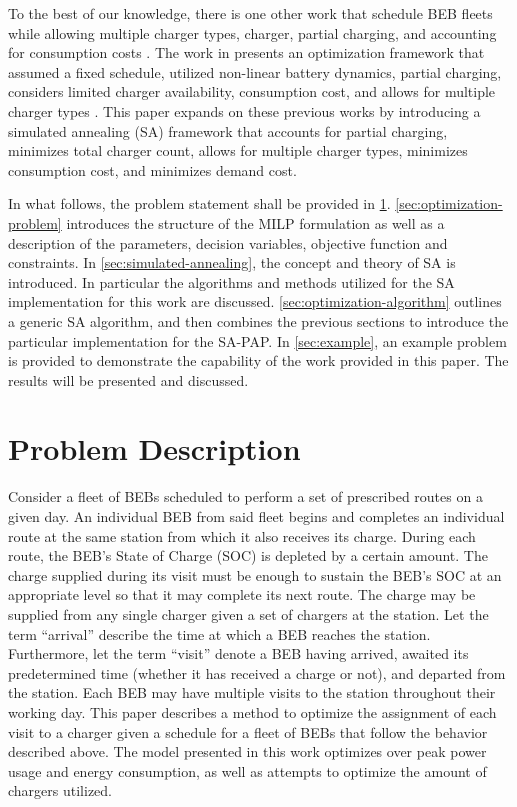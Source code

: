 \documentclass[ee,thesis]{usuthesis}
\begin{document}
To the best of our knowledge, there is one other work that schedule BEB fleets while allowing multiple charger types,
charger, partial charging, and accounting for consumption costs \cite{whitaker-2023-a-network}. The work in
\cite{whitaker-2023-a-network} presents an optimization framework that assumed a fixed schedule, utilized non-linear
battery dynamics, partial charging, considers limited charger availability, consumption cost, and allows for multiple
charger types \cite{whitaker-2023-a-network}. This paper expands on these previous works by introducing a simulated
annealing (SA) framework that accounts for partial charging, minimizes total charger count, allows for multiple charger
types, minimizes consumption cost, and minimizes demand cost.

In what follows, the problem statement shall be provided in \ref{sec:problem-description}. \ref{sec:optimization-problem}
introduces the structure of the MILP formulation as well as a description of the parameters, decision variables,
objective function and constraints. In \ref{sec:simulated-annealing}, the concept and theory of SA is introduced. In
particular the algorithms and methods utilized for the SA implementation for this work are discussed.
\ref{sec:optimization-algorithm} outlines a generic SA algorithm, and then combines the previous sections to introduce the
particular implementation for the SA-PAP. In \ref{sec:example}, an example problem is provided to demonstrate the capability
of the work provided in this paper. The results will be presented and discussed.

\section{Problem Description}
\label{sec:problem-description}
Consider a fleet of BEBs scheduled to perform a set of prescribed routes on a given day. An individual BEB from said
fleet begins and completes an individual route at the same station from which it also receives its charge. During each
route, the BEB's State of Charge (SOC) is depleted by a certain amount. The charge supplied during its visit must be
enough to sustain the BEB's SOC at an appropriate level so that it may complete its next route. The charge may be
supplied from any single charger given a set of chargers at the station. Let the term ``arrival'' describe the time at
which a BEB reaches the station. Furthermore, let the term ``visit'' denote a BEB having arrived, awaited its
predetermined time (whether it has received a charge or not), and departed from the station. Each BEB may have multiple
visits to the station throughout their working day. This paper describes a method to optimize the assignment of each
visit to a charger given a schedule for a fleet of BEBs that follow the behavior described above. The model presented in
this work optimizes over peak power usage and energy consumption, as well as attempts to optimize the amount of chargers
utilized.
\end{document}
